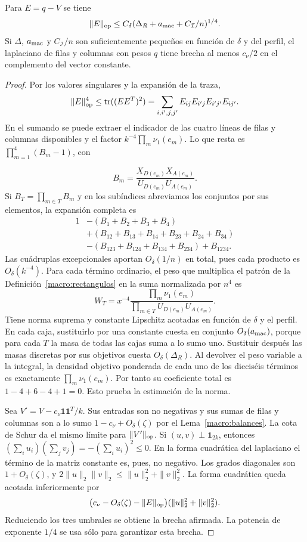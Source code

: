 \begin{lema}\label{macro:brecha}
Para $E=q-V$ se tiene
\[
 \|E\|_{\rm op}\le C_\delta(\Delta_R+a_{\rm mac}+C_{\mathcal I}/n)^{1/4}.
\]
Si $\Delta$, $a_{\rm mac}$ y $C_{\mathcal I}/n$ son suficientemente pequeños en función de $\delta$ y
del perfil, el
laplaciano de filas y columnas con pesos $q$ tiene brecha al menos $c_\nu/2$ en el complemento del
vector constante.
\end{lema}
\begin{proof}
Por los valores singulares y la expansión de la traza,
\[
 \|E\|_{\rm op}^4\le {\rm tr}((EE^T)^2)
 =\sum_{i,i',j,j'}E_{ij}E_{i'j}E_{i'j'}E_{ij'} .
\]
En el sumando se puede extraer el indicador de las cuatro líneas de filas y columnas disponibles y el
factor $k^{-4}\prod_m\nu_1(e_m)$. Lo que resta es $\prod_{m=1}^4(B_m-1)$, con

\[ B_m=\frac{X_{D(e_m)}X_{A(e_m)}}{U_{D(e_m)}U_{A(e_m)}}. \]
Si $B_T=\prod_{m\in T}B_m$ y en los subíndices
abreviamos los conjuntos por sus elementos, la expansión completa es
\[
 \begin{aligned}
 1
 &-(B_1+B_2+B_3+B_4)\\
 &+(B_{12}+B_{13}+B_{14}+B_{23}+B_{24}+B_{34})\\
 &-(B_{123}+B_{124}+B_{134}+B_{234})+B_{1234}.
 \end{aligned}
\]
Las cuádruplas excepcionales aportan $O_\delta(1/n)$ en total, pues cada producto es
$O_\delta(k^{-4})$. Para cada término ordinario, el peso que multiplica el patrón de la
Definición~\ref{macro:rectangulos} en la suma normalizada por $n^4$ es
\[
 W_T=x^{-4}\frac{\prod_m\nu_1(e_m)}
                 {\prod_{m\in T}U_{D(e_m)}U_{A(e_m)}} .
\]
Tiene norma suprema y constante Lipschitz acotadas en función de $\delta$ y el perfil. En cada caja,
sustituirlo por una constante cuesta en conjunto $O_\delta(a_{\rm mac})$, porque para cada $T$ la masa
de todas
las cajas suma a lo sumo uno. Sustituir después las masas discretas por sus objetivos cuesta
$O_\delta(\Delta_R)$. Al devolver el peso variable a la integral, la densidad objetivo ponderada de
cada uno de los dieciséis términos es exactamente $\prod_m\nu_1(e_m)$. Por tanto su coeficiente total
es $1-4+6-4+1=0$. Esto prueba la estimación de la norma.

Sea $V'=V-c_\nu\mathbf1\mathbf1^T/k$. Sus entradas son no negativas y sus sumas de filas y columnas son
a lo sumo $1-c_\nu+O_\delta(\zeta)$ por el Lema~\ref{macro:balances}. La cota de Schur da el mismo
límite para $\|V'\|_{\rm op}$. Si $(u,v)\perp\mathbf1_{2k}$, entonces $(\sum_i u_i)(\sum_j
v_j)=-(\sum_i u_i)^2\le0$. En la forma cuadrática del laplaciano el término de la matriz constante es,
pues, no negativo. Los grados diagonales son $1+O_\delta(\zeta)$, y
$2\|u\|_2\|v\|_2\le\|u\|_2^2+\|v\|_2^2$. La forma cuadrática queda acotada inferiormente por
\[
 \bigl(c_\nu-O_\delta(\zeta)-\|E\|_{\rm op}\bigr)
                   (\|u\|_2^2+\|v\|_2^2).
\]
Reduciendo los tres umbrales se obtiene la brecha afirmada. La potencia de exponente $1/4$ se usa sólo
para garantizar esta brecha.
\end{proof}
